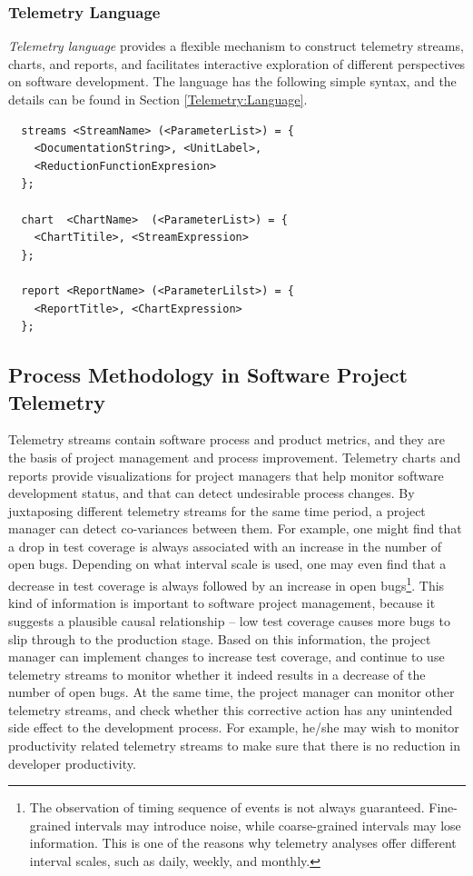 \subsubsection{Telemetry Language}


\textit{Telemetry language} provides a flexible mechanism to construct telemetry streams, charts, and reports, and facilitates interactive exploration of different perspectives on software development. The language has the following simple syntax, and the details can be found in Section \ref{Telemetry:Language}.

\begin{verbatim}
  streams <StreamName> (<ParameterList>) = {
    <DocumentationString>, <UnitLabel>, 
    <ReductionFunctionExpresion>
  };
    
  chart  <ChartName>  (<ParameterList>) = {
    <ChartTitile>, <StreamExpression>
  };
    
  report <ReportName> (<ParameterLilst>) = {
    <ReportTitle>, <ChartExpression>
  };
\end{verbatim}










\subsection{Process Methodology in Software Project Telemetry}
\label{Intro:Solution:ProcessMethodology}

Telemetry streams contain software process and product metrics, and they are the basis of project management and process improvement. Telemetry charts and reports provide visualizations for project managers that help monitor software development status, and that can detect undesirable process changes. By juxtaposing different telemetry streams for the same time period, a project manager can detect co-variances between them. For example, one might find that a drop in test coverage is always associated with an increase in the number of open bugs. Depending on what interval scale is used, one may even find that a decrease in test coverage is always followed by an increase in open bugs\footnote{The observation of timing sequence of events is not always guaranteed. Fine-grained intervals may introduce noise, while coarse-grained intervals may lose information. This is one of the reasons why telemetry analyses offer different interval scales, such as daily, weekly, and monthly.}. This kind of information is important to software project management, because it suggests a plausible causal relationship -- low test coverage causes more bugs to slip through to the production stage. Based on this information, the project manager can implement changes to increase test coverage, and continue to use telemetry streams to monitor whether it indeed results in a decrease of the number of open bugs. At the same time, the project manager can monitor other telemetry streams, and check whether this corrective action has any unintended side effect to the development process. For example, he/she may wish to monitor productivity related telemetry streams to make sure that there is no reduction in developer productivity. 

